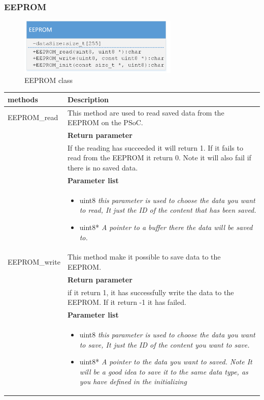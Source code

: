 \subsubsection{EEPROM}

\begin{figure}[H]
	\centering
	\includegraphics [width=3in]{../Documentation_RR/Software/Pictures/klassediagram_EEPROM.png}
	\caption{EEPROM class}
	\label{fig:Class_diagram_EEPROM}
\end{figure}


\begin{table}[H]
	\centering
	\begin{tabular}{|p{5 cm}|p{10 cm}|}
		\hline
		\textbf{methods} & \textbf{Description} \\ \hline
		
		EEPROM\_read
		& This method are used to read saved data from the EEPROM on the PSoC.
		\\ & \textbf{Return parameter}
		\\ & If the reading has succeeded it will return 1. If it fails to read from the EEPROM it return 0. Note it will also fail if there is no saved data.
		\\ & \textbf{Parameter list}
		\\ & \begin{itemize}
			\item {\large uint8}
			\subitem \textit{this parameter is used to choose the data you want to read, It just the ID of the content that has been saved.}
			\item {\large uint8*}
			\subitem \textit{A pointer to a buffer there the data will be saved to.}
		\end{itemize}
		\\ \hline
		
		EEPROM\_write
		& This method make it possible to save data to the EEPROM.
		\\ & \textbf{Return parameter}
		\\ & if it return 1, it has successfully write the data to the EEPROM. If it return -1 it has failed.
		\\ & \textbf{Parameter list}
		\\ & \begin{itemize}
			\item {\large uint8}
			\subitem \textit{this parameter is used to choose the data you want to save, It just the ID of the content you want to save.}
			\item {\large uint8*}
			\subitem \textit{A pointer to the data you want to saved. Note It will be a good idea to save it to the same data type, as you have defined in the initializing}
		\end{itemize}
		\\ \hline
		

\end{tabular}
\end{table}
